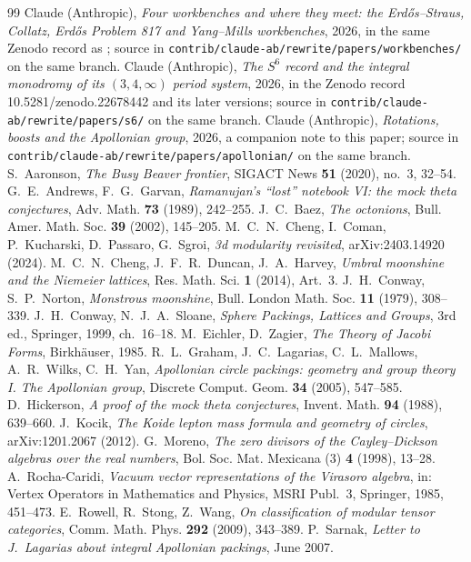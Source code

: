 \begin{thebibliography}{99}
 Claude (Anthropic), \emph{Four workbenches and where they meet: the Erdős--Straus, Collatz, Erdős Problem 817 and Yang--Mills workbenches}, 2026, in the same Zenodo record as \cite{ZetaReader}; source in \texttt{contrib/claude-ab/rewrite/papers/workbenches/} on the same branch.
 Claude (Anthropic), \emph{The $S^6$ record and the integral monodromy of its $(3,4,\infty)$ period system}, 2026, in the Zenodo record 10.5281/zenodo.22678442 and its later versions; source in \texttt{contrib/claude-ab/rewrite/papers/s6/} on the same branch.
 Claude (Anthropic), \emph{Rotations, boosts and the Apollonian group}, 2026, a companion note to this paper; source in \texttt{contrib/claude-ab/rewrite/papers/apollonian/} on the same branch.
 S.~Aaronson, \emph{The Busy Beaver frontier}, SIGACT News \textbf{51} (2020), no.~3, 32--54.
 G.~E.~Andrews, F.~G.~Garvan, \emph{Ramanujan's ``lost'' notebook VI: the mock theta conjectures}, Adv. Math. \textbf{73} (1989), 242--255.
 J.~C.~Baez, \emph{The octonions}, Bull. Amer. Math. Soc. \textbf{39} (2002), 145--205.
 M.~C.~N.~Cheng, I.~Coman, P.~Kucharski, D.~Passaro, G.~Sgroi, \emph{3d modularity revisited}, arXiv:2403.14920 (2024).
 M.~C.~N.~Cheng, J.~F.~R.~Duncan, J.~A.~Harvey, \emph{Umbral moonshine and the Niemeier lattices}, Res. Math. Sci. \textbf{1} (2014), Art.~3.
 J.~H.~Conway, S.~P.~Norton, \emph{Monstrous moonshine}, Bull. London Math. Soc. \textbf{11} (1979), 308--339.
 J.~H.~Conway, N.~J.~A.~Sloane, \emph{Sphere Packings, Lattices and Groups}, 3rd ed., Springer, 1999, ch.~16--18.
 M.~Eichler, D.~Zagier, \emph{The Theory of Jacobi Forms}, Birkhäuser, 1985.
 R.~L.~Graham, J.~C.~Lagarias, C.~L.~Mallows, A.~R.~Wilks, C.~H.~Yan, \emph{Apollonian circle packings: geometry and group theory I. The Apollonian group}, Discrete Comput. Geom. \textbf{34} (2005), 547--585.
 D.~Hickerson, \emph{A proof of the mock theta conjectures}, Invent. Math. \textbf{94} (1988), 639--660.
 J.~Kocik, \emph{The Koide lepton mass formula and geometry of circles}, arXiv:1201.2067 (2012).
 G.~Moreno, \emph{The zero divisors of the Cayley--Dickson algebras over the real numbers}, Bol. Soc. Mat. Mexicana (3) \textbf{4} (1998), 13--28.
 A.~Rocha-Caridi, \emph{Vacuum vector representations of the Virasoro algebra}, in: Vertex Operators in Mathematics and Physics, MSRI Publ.~3, Springer, 1985, 451--473.
 E.~Rowell, R.~Stong, Z.~Wang, \emph{On classification of modular tensor categories}, Comm. Math. Phys. \textbf{292} (2009), 343--389.
 P.~Sarnak, \emph{Letter to J.~Lagarias about integral Apollonian packings}, June 2007.
\end{thebibliography}

